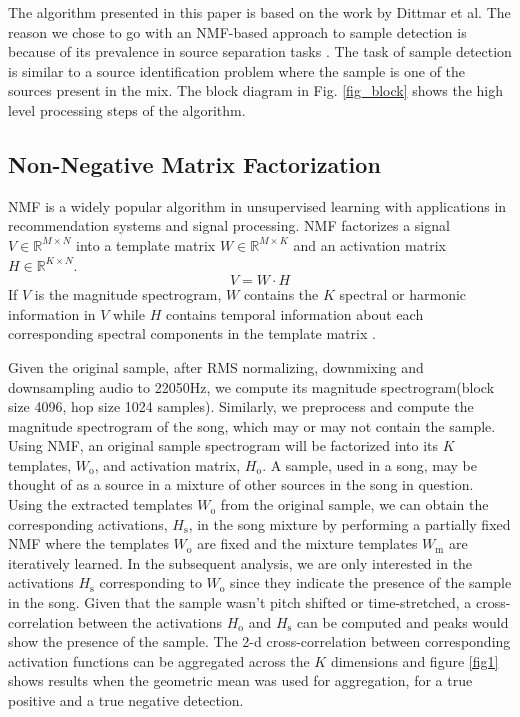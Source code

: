 \documentclass{article}
\begin{document}
The algorithm presented in this paper is based on the work by Dittmar et al. \cite{dittmar2012audio} The reason we chose to go with an NMF-based approach to sample detection is because of its prevalence in source separation tasks \cite{virtanen2007monaural}. The task of sample detection is similar to a source identification problem where the sample is one of the sources present in the mix. The block diagram in Fig. \ref{fig_block} shows the high level processing steps of the algorithm.

\subsection{Non-Negative Matrix Factorization}

NMF is a widely popular algorithm in unsupervised learning with applications in recommendation systems\cite{koren2009matrix} and signal processing\cite{lee1999learning}. NMF factorizes a signal $V \in \mathbb{R}^{M\times N}$ into a template matrix $W \in \mathbb{R}^{M\times K}$ and an activation matrix $H \in \mathbb{R}^{K\times N}$.
\[ V = W\cdot H\]
If $V$ is the magnitude spectrogram, $W$ contains the $K$ spectral or harmonic information in $V$ while $H$ contains temporal information about each corresponding spectral components in the template matrix \cite{smaragdis2003non}.

Given the original sample, after RMS normalizing, downmixing and downsampling audio to 22050Hz, we compute its magnitude spectrogram(block size 4096, hop size 1024 samples). Similarly, we preprocess and compute the magnitude spectrogram of the song, which may or may not contain the sample.
Using NMF, an original sample spectrogram will be factorized into its $K$ templates, $W_\mathrm{o}$, and activation matrix, $H_\mathrm{o}$. A sample, used in a song, may be thought of as a source in a mixture of other sources in the song in question. Using the extracted templates $W_\mathrm{o}$ from the original sample, we can obtain the corresponding activations, $H_\mathrm{s}$, in the song mixture by performing a partially fixed NMF\cite{wu2015drum} where the templates $W_\mathrm{o}$ are fixed and the mixture templates $W_\mathrm{m}$ are iteratively learned. In the subsequent analysis, we are only interested in the activations $H_\mathrm{s}$ corresponding to $W_\mathrm{o}$ since they indicate the presence of the sample in the song. Given that the sample wasn't pitch shifted or time-stretched, a cross-correlation between the activations $H_\mathrm{o}$ and $H_\mathrm{s}$ can be computed and peaks would show the presence of the sample. The 2-d cross-correlation between corresponding activation functions can be aggregated across the $K$ dimensions and figure \ref{fig1} shows results when the geometric mean was used for aggregation, for a true positive and a true negative detection.
\end{document}

